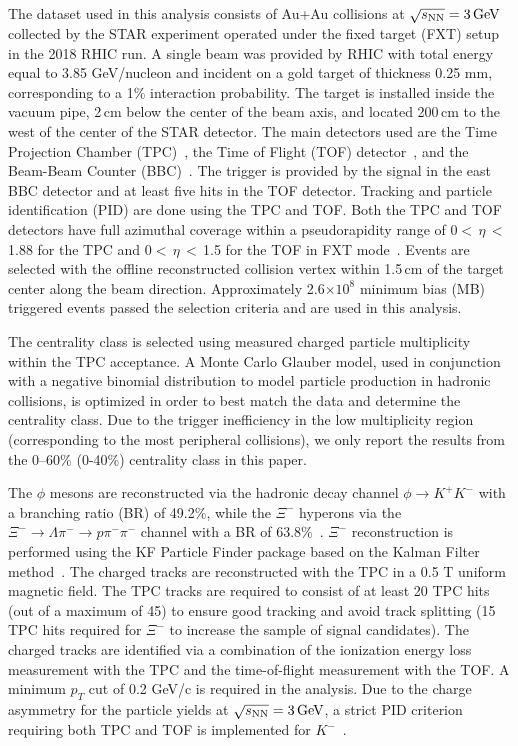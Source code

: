 \documentclass[%
 reprint,	
showpacs,
 amsmath,amssymb,
 aps,
 superscriptaddress,
]{revtex4-1}
\begin{document}
The dataset used in this analysis consists of Au+Au collisions at ${\sqrt{s_{\rm NN}} = \rm{3\,GeV}}$ collected by the STAR experiment operated under the fixed target (FXT) setup~\cite{Meehan_2016} in the 2018 RHIC run. 
A single beam was provided by RHIC with total energy equal to 3.85 GeV/nucleon and incident on a gold target of thickness 0.25 mm, corresponding to a 1\% interaction probability.
The target is installed inside the vacuum pipe, 2\,cm below the center of the beam axis, and located 200\,cm to the west of the center of the STAR detector. The main detectors used are the Time Projection Chamber (TPC)~\cite{TPC}, the Time of Flight (TOF) detector~\cite{TOF}, and the Beam-Beam Counter (BBC)~\cite{BBC_Whitten}. The trigger is provided by the signal in the east BBC detector and at least five hits in the TOF detector. Tracking and particle identification (PID) are done using the TPC and TOF. Both the TPC and TOF detectors have full azimuthal coverage within a pseudorapidity range of 0$<$\,$\eta$\,$<$\,1.88 for the TPC and 0$<$\,$\eta$\,$<$\,1.5 for the TOF in FXT mode~\cite{TPC,TOF}. Events are selected with the offline reconstructed collision vertex within 1.5\,cm of the target center along the beam direction. Approximately 2.6$\times 10^{8}$ minimum bias (MB) triggered events passed the selection criteria and are used in this analysis. 

The centrality class is selected using measured charged particle multiplicity within the TPC acceptance. 
A Monte Carlo Glauber model, used in conjunction with a negative binomial distribution to model particle production in hadronic collisions, is optimized in order to best match the data and determine the centrality class. Due to the trigger inefficiency in the low multiplicity region (corresponding to the most peripheral collisions), we only report the results from the 0--60\% (0-40\%) centrality class in this paper.

The $\phi$ mesons are reconstructed via the hadronic decay channel $\phi\rightarrow K^+K^-$ with a branching ratio (BR) of 49.2\%, while the $\Xi^{-}$ hyperons via the $\Xi^-\rightarrow \Lambda\pi^-\rightarrow p\pi^-\pi^-$ channel with a BR of 63.8\%~\cite{pdg}. $\Xi^-$ reconstruction is performed using the KF Particle Finder package based on the Kalman Filter method~\cite{Kisel:2018nvd,STAR_PRL_Xi_Oemga_polarization}. The charged tracks are reconstructed with the TPC in a 0.5 T uniform magnetic field. The TPC tracks are required to consist of at least 20 TPC hits (out of a maximum of 45) to ensure good tracking and avoid track splitting (15 TPC hits required for $\Xi^{-}$ to increase the sample of signal candidates). The charged tracks are identified via a combination of the ionization energy loss %
measurement with the TPC and the time-of-flight %
measurement with the TOF. A minimum $p_T$ cut of 0.2 GeV/c is required in the analysis.
Due to the charge asymmetry for the particle yields at ${\sqrt{s_{\rm NN}} = \rm{3\,GeV}}$, a strict PID criterion requiring both TPC and TOF is implemented for $K^-$~\cite{Xu:2008th,Shao:2005iu}. 
\end{document}
